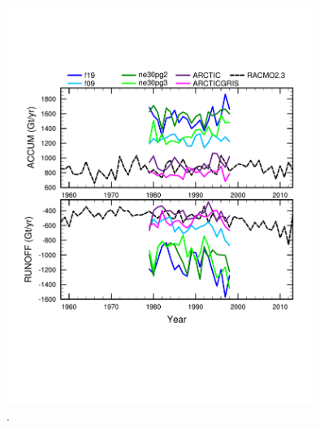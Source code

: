 \documentclass[draft]{agujournal2019}
\begin{document}
\begin{figure}[t]
\begin{center}
         \includegraphics[width=100mm]{figs/temp_tseries_GRIS.pdf}
\end{center}
\caption{.}
\label{fig:tseries}
\end{figure}
\end{document}
